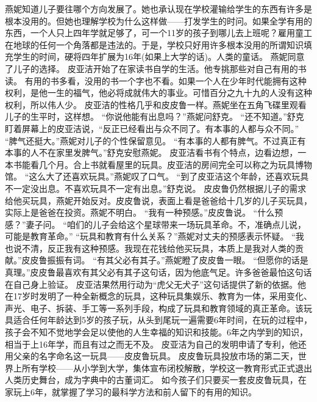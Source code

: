 \documentclass[a4paper,12pt,UTF8,twoside]{ctexbook}
\begin{document}
        燕妮知道儿子要往哪个方向发展了。她也承认现在学校灌输给学生的东西有许多是根本没用的。但她也理解学校为什么这样做——打发学生的时问。如果全学有用的东西，一个人只上四年学就足够了，可一个11岁的孩子到哪儿去上班呢？雇用童工在地球的任何一个角落都是违法的。于是，学校只好用许多根本没用的所谓知识填充学生的时间，硬将四年扩展为16年(如果上大学的话)。人类的童话。  
        燕妮同意了儿子的选择。        
        皮亚洁开始了在家读书自学的生活。他专挑那些对自己有用的书读。  
        有用的书多看，没用的书一个字也不看。如果一个人在少年时代能拥有这种权利，是他一生的福气，他必将成就伟大的事业。可惜百分之九十九的人没有这种权利，所以伟人少。  
        皮亚洁的性格几乎和皮皮鲁一样。燕妮坐在五角飞碟里观看儿子的生平时，这样想。  
        “你说他能有出息吗？”燕妮问舒克。  
        “还不知道。”舒克盯着屏幕上的皮亚洁说，“反正已经看出与众不同了。有本事的人都与众不同。”  
        “脾气还挺大。”燕妮对儿子的个性保留意见。  
        “有本事的人都有脾气。不过真正有本事的人不在家里发脾气。”舒克安慰燕妮。  
        皮亚洁看书有个特点，边看边想，一本书能看几个月。合上书就看屋里的玩具。皮亚洁的房间完全可以称之为玩具博物馆。  
        “这么大了还喜欢玩具。”燕妮叹了口气。  
        “到了皮亚洁这个年龄，还喜欢玩具不一定没出息。不喜欢玩具不一定有出息。”舒克说。  
        皮皮鲁仍然根据儿子的需求给他买玩具，燕妮开始反对。皮皮鲁说，表面上看是爸爸给十几岁的儿子买玩具，实际上是爸爸在投资。燕妮不明白。        
        “我有一种预感。”皮皮鲁说。  
        “什么预感？”妻子问。  
        “咱们的儿子会给这个星球带来一场玩具革命。不，准确点儿说，可能是教育革命。”  
        “玩具和教育有什么关系？”燕妮对丈夫的预感表示怀疑。  
        “我也说不清，反正我有这种预感。我现在花钱给他买玩具，本质上是我对人类的贡献。”皮皮鲁振振有词。  
        “有其父必有其子。”燕妮瞪了皮皮鲁一眼。  
        “但愿你的话是真理。”皮皮鲁最喜欢有其父必有其子这句话，因为他底气足。许多爸爸最怕这句话在自己身上验证。  
        皮亚洁果然用行动为“虎父无犬子”这句话提供了新的依据。他在17岁时发明了一种全新概念的玩具，这种玩具集娱乐、教育为一体，采用变化、声光、电子、拆装、手工等一系列手段，构成了玩具和教育领域的真正革命。该玩具适合任何年龄达到5岁的孩子玩，从头到尾玩一遍需要6年时间，在玩的过程中，孩子会不知不觉地学会足以使他的人生幸福的知识和技能。6年之内学到的知识，相当于上16年学，而且有过之而无不及。  
        皮亚洁为自己的发明申请了专利，他还用父亲的名字命名这一玩具——皮皮鲁玩具。        
        皮皮鲁玩具投放市场的第二天，世界上所有学校——从小学到大学，集体宣布闭校解散，学校这一教育形式正式退出人类历史舞台，成为字典中的古董词汇。  
        如今孩子们只要买一套皮皮鲁玩具，在家玩上6年，就掌握了学习的最科学方法和前人留下的有用的知识。  
\end{document}
